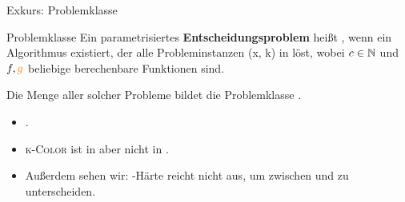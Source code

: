 \documentclass[navbaroff]{sdqbeamer}
\begin{document}
\begin{frame}[t]{Exkurs: Problemklasse \XP}
    \begin{blueblock}{Problemklasse \XP}
        Ein parametrisiertes \textbf{Entscheidungsproblem} heißt ,
        wenn ein Algorithmus existiert, der alle Probleminstanzen (x, k) in  löst, wobei $ c \in \mathbb{N} $ und $f, \textcolor{orange}{g}$ beliebige berechenbare Funktionen sind.

        \vspace{10pt}
        Die Menge aller solcher Probleme bildet die Problemklasse \blue{\XP}.
    \end{blueblock}
    \begin{itemize}
        \item \red{$\W[1] \subseteq \XP$}.
        \item \textsc{k-Color} ist in \ParaNP aber nicht in \XP.
        \item Außerdem sehen wir: \NP-Härte reicht nicht aus, um zwischen \W[1] und \FPT zu unterscheiden.
    \end{itemize}
\end{frame}
\end{document}
